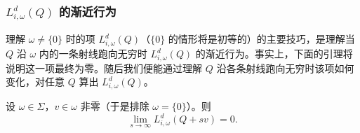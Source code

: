 
\subsubsection{$L_{i,\omega}^d(Q)$ 的渐近行为}

理解 $\omega\ne\{0\}$ 时的项 $L_{i,\omega}^d(Q)$（$\{0\}$ 的情形将是初等的）的主要技巧，是理解当 $Q$ 沿 $\omega$ 内的一条射线跑向无穷时 $L_{i,\omega}^d(Q)$ 的渐近行为。事实上，下面的引理将说明这一项最终为零。随后我们便能通过理解 $Q$ 沿各条射线跑向无穷时该项如何变化，对任意 $Q$ 算出 $L_{i,\omega}^d(Q)$。

\begin{lemma}
  设 $\omega\in\Sigma$，$v\in\omega$ 非零（于是排除 $\omega=\{0\}$）。则
  \begin{equation}
    \lim_{s\to\infty}L_{i,\omega}^d(Q+sv)=0. \tag{5.32}
  \end{equation}
\end{lemma}

